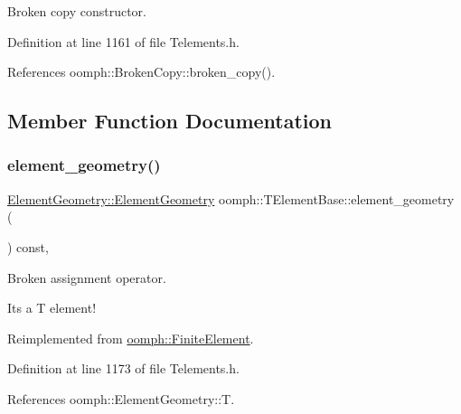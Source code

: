 Broken copy constructor. 



Definition at line 1161 of file Telements.\+h.



References oomph\+::\+Broken\+Copy\+::broken\+\_\+copy().



\subsection{Member Function Documentation}
\mbox{\label{classoomph_1_1TElementBase_a2dc9fee159f9f682e195bd6ebfd5f1b6}} 
\subsubsection{\texorpdfstring{element\+\_\+geometry()}{element\_geometry()}}
{\footnotesize\ttfamily \hyperlink{namespaceoomph_1_1ElementGeometry_a86ff99972b0205d7524e294c58c1182a}{Element\+Geometry\+::\+Element\+Geometry} oomph\+::\+T\+Element\+Base\+::element\+\_\+geometry (\begin{DoxyParamCaption}{ }\end{DoxyParamCaption}) const\hspace{0.3cm}{\ttfamily [inline]}, {\ttfamily [virtual]}}



Broken assignment operator. 

It\textquotesingle{}s a T element! 

Reimplemented from \hyperlink{classoomph_1_1FiniteElement_a66de72bbd8d710fd5f456c72433c34a7}{oomph\+::\+Finite\+Element}.



Definition at line 1173 of file Telements.\+h.



References oomph\+::\+Element\+Geometry\+::T.

\mbox{\label{classoomph_1_1TElementBase_aa13f1d631a3373f8981b748dd469ff8f}} 
